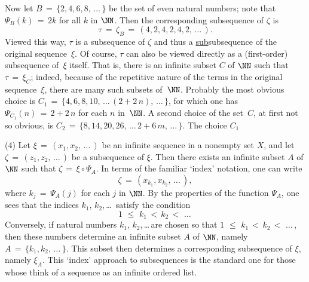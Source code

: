 {        Now let $B \,=\, \{2,4,6,8,\,{\ldots}\,\}$ be the set of even natural numbers; note that ${\Psi}_{B}(k) \,=\, 2k$ for all $k$ in ${\NN}$.
    Then the corresponding subsequence of ${\zeta}$ is
        \begin{displaymath}
        {\tau} \,=\, {\zeta}_{B} \,=\, (4,2,4,2,4,2,\,{\ldots}\,).
        \end{displaymath}
    Viewed this way, ${\tau}$ is a subsequence of ${\zeta}$ and thus a \underline{sub}subsequence of the original sequence~${\xi}$.
    Of course, ${\tau}$ can also be viewed directly as a (first-order) subsequence of~${\xi}$ itself.
    That is, there is an infinite subset $C$ of ${\NN}$ such that ${\tau} \,=\, {\xi}_{C}$;
    indeed, because of the repetitive nature of the terms in the original sequence~${\xi}$, there are many such subsets of~${\NN}$.
    Probably the most obvious choice is $C_{1} \,=\, \{4, 6, 8, 10, \,{\ldots}\,(2+2\,n),\,{\ldots}\,\}$,
    for which one has ${\Psi}_{C_{1}}(n) \,=\, 2+2\,n$ for each $n$ in~${\NN}$. A second choice of the set~$C$,
    at first not so obvious, is $C_{2} \,=\, \{8, 14, 20, 26, \,{\ldots}\,2+6\,m,\,{\ldots}\,\}$.
    The choice $C_{1}$

\V

        (4) Let ${\xi} \,=\, (x_{1},x_{2},\,{\ldots}\,)$  be an infinite sequence in a nonempty set $X$, and let ${\zeta} \,=\, (z_{1},z_{2},\,{\ldots}\,)$ be a subsequence of ${\xi}$.
    Then there exists an infinite subset $A$ of ${\NN}$ such that ${\zeta} \,=\, {\xi}{\circ}{\Psi}_{A}$.
    In terms of the familiar `index' notation, one can write
        \begin{displaymath}
        {\zeta} \,=\, (x_{k_{1}},x_{k_{2}},\,{\ldots}\,),
        \end{displaymath}
    where $k_{j} \,=\, {\Psi}_{A}(j)$ for each $j$ in ${\NN}$.
    By the properties of the function ${\Psi}_{A}$, one sees that the indices $k_{1}$, $k_{2}$,\,{\ldots}\, satisfy the condition
        \begin{displaymath}
        1\,\,{\leq}\,\,k_{1}\,<\,k_{2}\,<\,\,{\ldots}\,
        \end{displaymath}
    Conversely, if natural numbers $k_{1}$, $k_{2}$,\,{\ldots}\,are chosen so that $1\,\,{\leq}\,\,k_{1}\,<\,k_{2}\,<\,\,{\ldots}\,$,
    then these numbers determine an infinite subset $A$ of ${\NN}$, namely $A \,=\, \{k_{1},k_{2},\,{\ldots}\,\}$.
    This subset then determines a corresponding subsequence of ${\xi}$, namely ${\xi}_{A}$.
    This `index' approach to subsequences is the standard one for those whose think of a sequence as an infinite ordered list.

}
